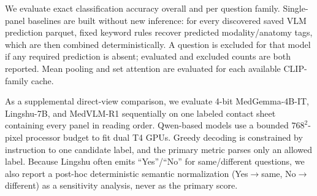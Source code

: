 \documentclass{article}
\begin{document}

We evaluate exact classification accuracy overall and per question family. Single-panel baselines are built without new inference: for every discovered saved VLM prediction parquet, fixed keyword rules recover predicted modality/anatomy tags, which are then combined deterministically. A question is excluded for that model if any required prediction is absent; evaluated and excluded counts are both reported. Mean pooling and set attention are evaluated for each available CLIP-family cache.

As a supplemental direct-view comparison, we evaluate 4-bit MedGemma-4B-IT, Lingshu-7B, and MedVLM-R1 sequentially on one labeled contact sheet containing every panel in reading order. Qwen-based models use a bounded $768^2$-pixel processor budget to fit dual T4 GPUs. Greedy decoding is constrained by instruction to one candidate label, and the primary metric parses only an allowed label. Because Lingshu often emits ``Yes''/``No'' for same/different questions, we also report a post-hoc deterministic semantic normalization (Yes$\rightarrow$same, No$\rightarrow$different) as a sensitivity analysis, never as the primary score.
\end{document}
